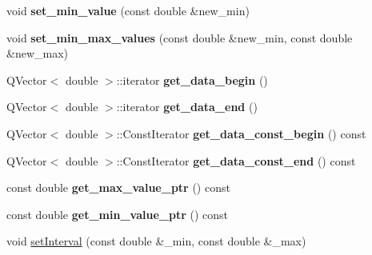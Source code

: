 \begin{DoxyCompactItemize}
\mbox{\label{classdisplay__screen__raster_a8a4da270a9fc4269dffc86c3a80463d0}} 
void {\bfseries set\+\_\+min\+\_\+value} (const double \&new\+\_\+min)
\item 
\mbox{\label{classdisplay__screen__raster_afd08c36c3a75cae7b3ffab7acee90b90}} 
void {\bfseries set\+\_\+min\+\_\+max\+\_\+values} (const double \&new\+\_\+min, const double \&new\+\_\+max)
\item 
\mbox{\label{classdisplay__screen__raster_ab13b2d6bbfce1b21386136eef65bbbef}} 
Q\+Vector$<$ double $>$\+::iterator {\bfseries get\+\_\+data\+\_\+begin} ()
\item 
\mbox{\label{classdisplay__screen__raster_a23ddb56ac7a520bfea79420043ef1bbc}} 
Q\+Vector$<$ double $>$\+::iterator {\bfseries get\+\_\+data\+\_\+end} ()
\item 
\mbox{\label{classdisplay__screen__raster_a0e242ba6b3b79f336d548b13ab25d74e}} 
Q\+Vector$<$ double $>$\+::Const\+Iterator {\bfseries get\+\_\+data\+\_\+const\+\_\+begin} () const
\item 
\mbox{\label{classdisplay__screen__raster_a53b12f7bae3d50b197e16574efbeeccb}} 
Q\+Vector$<$ double $>$\+::Const\+Iterator {\bfseries get\+\_\+data\+\_\+const\+\_\+end} () const
\item 
\mbox{\label{classdisplay__screen__raster_a173e087eea352bdb14c01eb5d98a6f50}} 
const double {\bfseries get\+\_\+max\+\_\+value\+\_\+ptr} () const
\item 
\mbox{\label{classdisplay__screen__raster_a08709a1fc188c287f1440f85b48ca976}} 
const double {\bfseries get\+\_\+min\+\_\+value\+\_\+ptr} () const
\item 
void \mbox{\hyperlink{classdisplay__screen__raster_aacbbdf19c624ecb6f09c32c27b6f4132}{set\+Interval}} (const double \&\+\_\+min, const double \&\+\_\+max)
\item 
\mbox{\label{classdisplay__screen__raster_aabe35c0294f6bde7f49ba78501fe6f62}} 

\end{DoxyCompactItemize}
